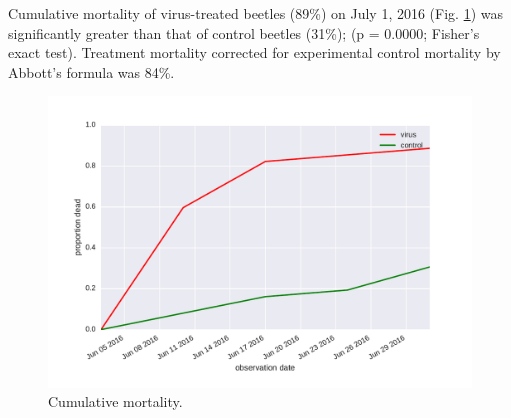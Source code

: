 \documentclass[letterpaper,11pt]{scrartcl}
\begin{document}
Cumulative mortality of virus-treated beetles (89\%) on July 1, 2016 (Fig. \ref{mortality}) was significantly greater than that of 
control beetles (31\%); (p = 0.0000; Fisher's exact test). Treatment mortality corrected for experimental control mortality by Abbott's 
formula was 84\%.

 
\begin{figure}
\centering
\includegraphics[width = \textwidth]{wb4_mortality.pdf}
\caption{Cumulative mortality.}
\label{mortality}
\end{figure} 
 
 
%
%
\end{document}
